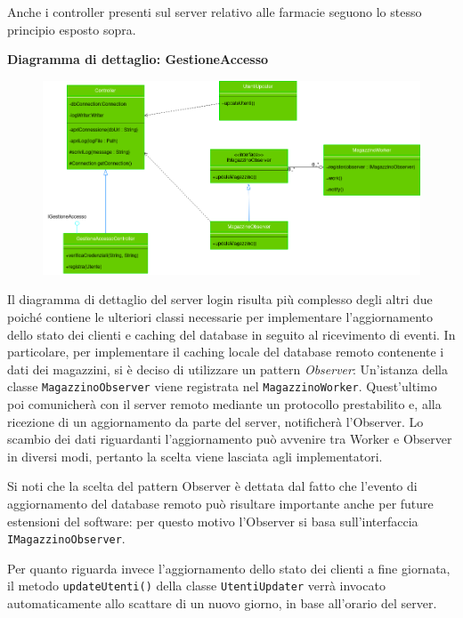 Anche i controller presenti sul server relativo alle farmacie seguono lo stesso principio esposto sopra.

\newpage

\textbf{Diagramma di dettaglio: GestioneAccesso}
\begin{figure}[h!]
    \begin{center}
        \includegraphics[width=\textwidth]{immagini/ControllerLogin-progettazione.png}
    \end{center}
\end{figure}

Il diagramma di dettaglio del server login risulta più complesso degli altri due
poiché contiene le ulteriori classi necessarie per implementare l'aggiornamento dello stato dei clienti
e caching del database in seguito al ricevimento di eventi.
In particolare, per implementare il caching locale del database remoto contenente i dati dei magazzini,
si è deciso di utilizzare un pattern \textit{Observer}: Un'istanza della classe \texttt{MagazzinoObserver} viene registrata
nel \texttt{MagazzinoWorker}. Quest'ultimo poi comunicherà con il server remoto mediante un protocollo prestabilito e,
alla ricezione di un aggiornamento da parte del server, notificherà l'Observer. Lo scambio dei dati riguardanti l'aggiornamento può avvenire tra Worker e Observer in diversi modi,
pertanto la scelta viene lasciata agli implementatori.

Si noti che la scelta del pattern Observer è dettata dal fatto che l'evento di aggiornamento del database remoto può risultare importante anche per future estensioni del software:
per questo motivo l'Observer si basa sull'interfaccia \texttt{IMagazzinoObserver}.

Per quanto riguarda invece l'aggiornamento dello stato dei clienti a fine giornata,
il metodo \texttt{updateUtenti()} della classe \texttt{UtentiUpdater} verrà invocato automaticamente
allo scattare di un nuovo giorno, in base all'orario del server.

